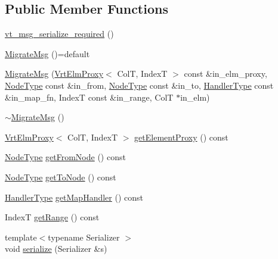 \subsection*{Public Member Functions}
\begin{DoxyCompactItemize}
\item 
\hyperlink{structvt_1_1vrt_1_1collection_1_1_migrate_msg_ad6dcb8f2f1555556800b50195d219c19}{vt\+\_\+msg\+\_\+serialize\+\_\+required} ()
\item 
\hyperlink{structvt_1_1vrt_1_1collection_1_1_migrate_msg_a0b41c5d241e067dadb4648653f9909bc}{Migrate\+Msg} ()=default
\item 
\hyperlink{structvt_1_1vrt_1_1collection_1_1_migrate_msg_a900313445de89550eca07334a2ca21ba}{Migrate\+Msg} (\hyperlink{structvt_1_1vrt_1_1collection_1_1_vrt_elm_proxy}{Vrt\+Elm\+Proxy}$<$ ColT, IndexT $>$ const \&in\+\_\+elm\+\_\+proxy, \hyperlink{namespacevt_a866da9d0efc19c0a1ce79e9e492f47e2}{Node\+Type} const \&in\+\_\+from, \hyperlink{namespacevt_a866da9d0efc19c0a1ce79e9e492f47e2}{Node\+Type} const \&in\+\_\+to, \hyperlink{namespacevt_af64846b57dfcaf104da3ef6967917573}{Handler\+Type} const \&in\+\_\+map\+\_\+fn, IndexT const \&in\+\_\+range, ColT $\ast$in\+\_\+elm)
\item 
\hyperlink{structvt_1_1vrt_1_1collection_1_1_migrate_msg_a67874e771516da55d7509353dfa3a249}{$\sim$\+Migrate\+Msg} ()
\item 
\hyperlink{structvt_1_1vrt_1_1collection_1_1_vrt_elm_proxy}{Vrt\+Elm\+Proxy}$<$ ColT, IndexT $>$ \hyperlink{structvt_1_1vrt_1_1collection_1_1_migrate_msg_a6a8d4f819ebe556df1f3533bfa0e21f2}{get\+Element\+Proxy} () const
\item 
\hyperlink{namespacevt_a866da9d0efc19c0a1ce79e9e492f47e2}{Node\+Type} \hyperlink{structvt_1_1vrt_1_1collection_1_1_migrate_msg_ab3b156dd31382eab3551024ee3668fad}{get\+From\+Node} () const
\item 
\hyperlink{namespacevt_a866da9d0efc19c0a1ce79e9e492f47e2}{Node\+Type} \hyperlink{structvt_1_1vrt_1_1collection_1_1_migrate_msg_a24d93f9c73876f57d51a83f53a6e6796}{get\+To\+Node} () const
\item 
\hyperlink{namespacevt_af64846b57dfcaf104da3ef6967917573}{Handler\+Type} \hyperlink{structvt_1_1vrt_1_1collection_1_1_migrate_msg_a53385ade125d280d5621f1b5cdbffa78}{get\+Map\+Handler} () const
\item 
IndexT \hyperlink{structvt_1_1vrt_1_1collection_1_1_migrate_msg_a248315e475abddd6d6b0d0213d6c2dab}{get\+Range} () const
\item 
{\footnotesize template$<$typename Serializer $>$ }\\void \hyperlink{structvt_1_1vrt_1_1collection_1_1_migrate_msg_afd275449bca23638c2d8139fff35d39f}{serialize} (Serializer \&s)
\end{DoxyCompactItemize}
